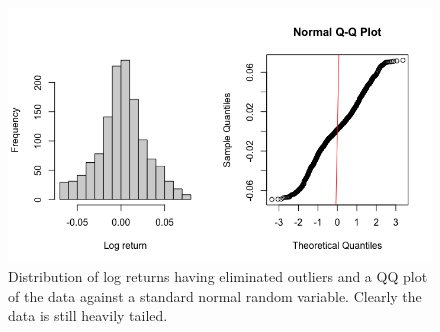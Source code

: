 \documentclass[twoside]{report}
\begin{document}
\begin{spacing}{1}
\begin{figure}
    \centering
    \includegraphics[width=\linewidth]{Extremal Modelling/distplots_sans_outliers.png}
    \caption{Distribution of log returns having eliminated outliers and a QQ plot of the data against a standard normal random variable. Clearly the data is still heavily tailed.}
    \label{fig:distplots_sans_outliers}
\end{figure}










\end{spacing}
\end{document}
